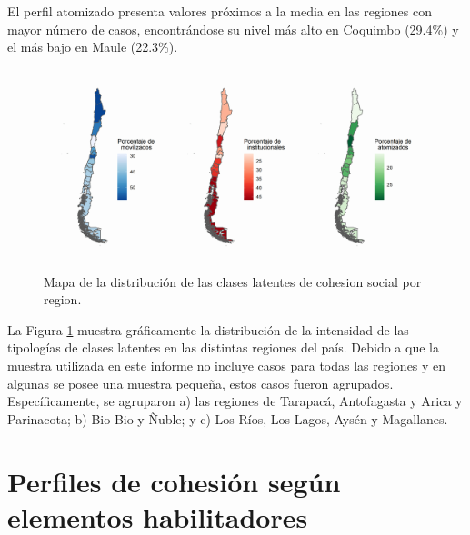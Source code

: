 \documentclass[
  12pt,
]{book}
\begin{document}
El perfil atomizado presenta valores próximos a la media en las regiones con mayor número de casos, encontrándose su nivel más alto en Coquimbo (29.4\%) y el más bajo en Maule (22.3\%).

\begin{figure}[H]

{\centering \includegraphics[width=1\linewidth,height=1\textheight]{output/graphs/mapas_region} 

}

\caption{Mapa de la distribución de las clases latentes de cohesion social por region.}\label{fig:mapas-region}
\end{figure}

La Figura \ref{fig:mapas-region} muestra gráficamente la distribución de la intensidad de las tipologías de clases latentes en las distintas regiones del país. Debido a que la muestra utilizada en este informe no incluye casos para todas las regiones y en algunas se posee una muestra pequeña, estos casos fueron agrupados. Específicamente, se agruparon a) las regiones de Tarapacá, Antofagasta y Arica y Parinacota; b) Bio Bio y Ñuble; y c) Los Ríos, Los Lagos, Aysén y Magallanes.

\hypertarget{perfiles-de-cohesiuxf3n-seguxfan-elementos-habilitadores}{%
\section{Perfiles de cohesión según elementos habilitadores}\label{perfiles-de-cohesiuxf3n-seguxfan-elementos-habilitadores}}
\end{document}
